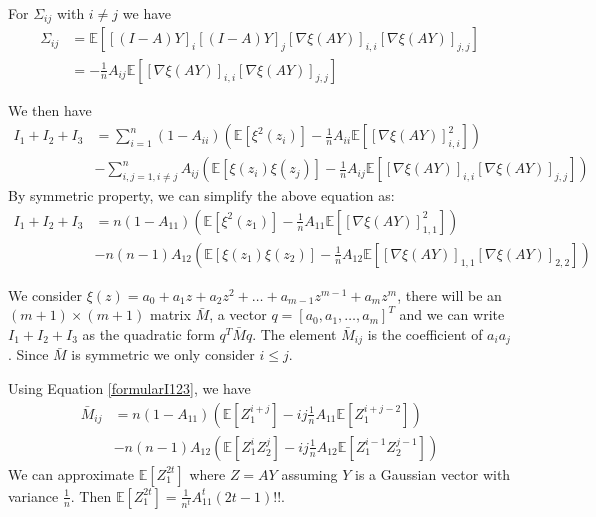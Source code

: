 \documentclass{article}
\def\E{\mathbb{E}}
\begin{document}
For $\Sigma_{ij}$ with $i\neq j$ we have
\begin{align*}
\Sigma_{ij} &=  \E[ [(I-A)Y]_i [(I-A)Y]_j [\nabla \xi(AY)]_{i,i}
[\nabla \xi(AY)]_{j,j}]  \\
&= - \frac{1}{n}A_{ij} \E[[\nabla \xi(AY)]_{i,i} [\nabla \xi(AY)]_{j,j}]
\end{align*}

We then have
\begin{align*}
I_1+I_2+I_3 &= \sum_{i=1}^n (1-A_{ii})(\E[\xi^2(z_i)] -
\frac{1}{n} A_{ii} \E[ [\nabla \xi(AY)]_{i,i}^2]) \\
&- \sum_{i,j=1, i \neq j}^n A_{ij} (\E[\xi(z_i)\xi(z_j)] -
\frac{1}{n}A_{ij}\E[[\nabla \xi(AY)]_{i,i} [\nabla \xi(AY)]_{j,j}])
\end{align*}
By symmetric property, we can simplify the above equation as:
\begin{align}\label{formularI123}
I_1+I_2+I_3 &=n(1-A_{11})(\E[\xi^2(z_1)] -
\frac{1}{n} A_{11} \E[ [\nabla \xi(AY)]_{1,1}^2]) \\
&- n(n-1)A_{12}(\E[\xi(z_1)\xi(z_2)] -
\frac{1}{n}A_{12}\E[[\nabla \xi(AY)]_{1,1}
[\nabla \xi(AY)]_{2,2}])\nonumber
\end{align}

We consider
$\xi(z) = a_0 + a_1 z + a_2 z^2 + \dots + a_{m-1} z^{m-1} + a_m z^m $,
there will be an $(m+1) \times (m+1) $ matrix $\bar{M}$,
a vector $q = [a_0, a_1, \dots, a_m]^T$ and
we can write $I_1 + I_2 + I_3$
as the quadratic form $ q^T \bar{M} q $.
The element $\bar{M}_{ij}$ is the coefficient of $a_ia_j$.
Since $\bar{M}$ is symmetric we only consider $i\leq j$.

Using Equation \ref{formularI123}, we have
\begin{align*}
\bar{M}_{ij} &= n(1-A_{11}) (\E[Z_1^{i+j}] -
ij \frac{1}{n}A_{11} \E[Z_1^{i+j-2}])  \\
&-n(n-1)A_{12}(\E[Z_1^i Z_2^j] - ij \frac{1}{n}A_{12}\E[Z_1^{i-1}Z_2^{j-1}])
\end{align*}
We can approximate $\E[Z_1^{2t}]$ where
$Z=AY$ assuming $Y$ is a Gaussian vector with variance $\frac{1}{n}$.
Then $\E[Z_1^{2t}] = \frac{1}{n^t}A_{11}^t (2t-1)!!$.
\end{document}
